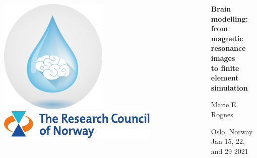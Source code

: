 \documentclass[10pt, mathserif, aspectratio=169, t]{beamer}
\begin{document}
\begin{frame}
\begin{columns}
\begin{column}{0.25\textwidth}
    \vspace{1em}
    \includegraphics[width=0.5\textwidth]{graphics/waterscape_logo.png} \\
    \vspace{1em}
    \includegraphics[width=\textwidth]{graphics/rcn-logo.pdf} \\
    \end{column}
    \begin{column}{0.75\textwidth}
    {
    \centering

      \vspace{4em}

      {\bf Brain modelling: \\ from magnetic resonance images \\ to finite element simulation} \\

      \bigskip
      \bigskip
      

      Marie E. Rognes \\
      \bigskip
      \bigskip

      Oslo, Norway \\
      \medskip
      Jan 15, 22, and 29 2021 \\
      }
    \end{column}
  \end{columns}
\end{frame}

\cleanpage
\end{document}
